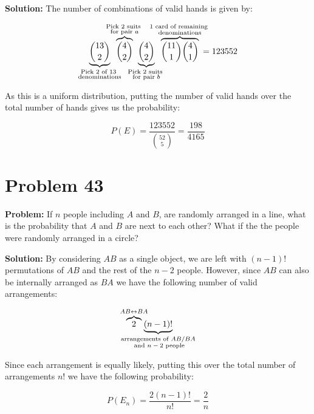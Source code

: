 \documentclass{article}
\begin{document}
\noindent\textbf{Solution:} The number of combinations of valid hands is given by:

\begin{equation*}
    \underbrace{\binom{13}{2}}_{\substack{\text{Pick 2 of 13 }\\\text{denominations}}}\mkern-35mu
    \overbrace{\binom{4}{2}}^{\substack{\text{Pick 2 suits }\\\text{for pair $a$}}}\mkern-35mu
    \underbrace{\binom{4}{2}}_{\substack{\text{Pick 2 suits }\\\text{for pair $b$}}}\mkern-35mu
    \overbrace{\binom{11}{1}\binom{4}{1}}^{\substack{\text{1 card of remaining }\\\text{denominations}}}\mkern-20mu=123552
\end{equation*}

As this is a uniform distribution, putting the number of valid hands over the total number of hands gives us the probability:

\begin{equation*}
    P(E)=\frac{123552}{\binom{52}{5}}=\frac{198}{4165}
\end{equation*}

\section*{Problem 43}
\noindent\textbf{Problem:} If $n$ people including $A$ and $B$, are randomly arranged in a line, what is the probability that $A$ and $B$ are next to each other? What if the the people were randomly arranged in a circle?
\bigskip

\noindent\textbf{Solution:} By considering $AB$ as a single object, we are left with $(n-1)!$ permutations of $AB$ and the rest of the $n-2$ people. However, since $AB$ can also be internally arranged as $BA$ we have the following number of valid arrangements:

\begin{equation*}
    \overbrace{2}^{AB \leftrightarrow BA}\mkern-60mu\underbrace{(n-1)!}_{\substack{\text{arrangements of }AB\text{/}BA\\
    \text{ and $n-2$ people}}}
\end{equation*}

Since each arrangement is equally likely, putting this over the total number of arrangements $n!$ we have the following probability:

\begin{equation*}
    P(E_n)=\frac{2(n-1)!}{n!}=\frac{2}{n}
\end{equation*}
\end{document}
